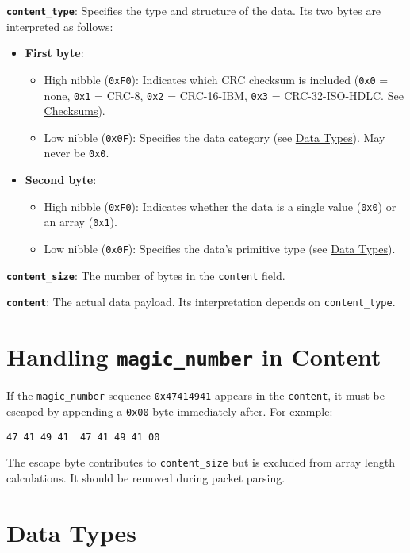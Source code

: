 \documentclass[a4paper]{article}
\begin{document}
\textbf{\texttt{content\_type}}: Specifies the type and structure of the data. Its two bytes are interpreted as follows:
\begin{itemize}
  \item \textbf{First byte}:
  \begin{itemize}
    \item High nibble (\texttt{0xF0}): Indicates which CRC checksum is included (\texttt{0x0} = none, \texttt{0x1} = CRC-8, \texttt{0x2} = CRC-16-IBM, \texttt{0x3} = CRC-32-ISO-HDLC. See \hyperref[checksums]{Checksums}).
    \item Low nibble (\texttt{0x0F}): Specifies the data category  (see \hyperref[data-types]{Data Types}). May never be \texttt{0x0}.
  \end{itemize}
  \item \textbf{Second byte}:
  \begin{itemize}
    \item High nibble (\texttt{0xF0}): Indicates whether the data is a single value (\texttt{0x0}) or an array (\texttt{0x1}).
    \item Low nibble (\texttt{0x0F}): Specifies the data's primitive type (see \hyperref[data-types]{Data Types}).
  \end{itemize}
\end{itemize}

\textbf{\texttt{content\_size}}: The number of bytes in the \texttt{content} field.

\textbf{\texttt{content}}: The actual data payload. Its interpretation depends on \texttt{content\_type}.

\section{Handling \texttt{magic\_number} in Content}
If the \texttt{magic\_number} sequence \texttt{0x47414941} appears in the \texttt{content}, it must be escaped by appending a \texttt{0x00} byte immediately after. For example:

\texttt{47 41 49 41 }\textrightarrow\texttt{ 47 41 49 41 00}

The escape byte contributes to \texttt{content\_size} but is excluded from array length calculations. It should be removed during packet parsing.

\section{Data Types}\label{data-types}
\end{document}
